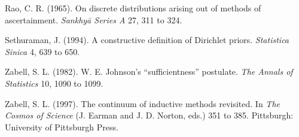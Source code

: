 \begin{thebibliography}{}
Rao, C. R. (1965). On discrete distributions arising out of methods of ascertainment.
\textit{Sankhy\=a Series A} 27, 311 to 324.

Sethuraman, J. (1994). A constructive definition of Dirichlet priors.
\textit{Statistica Sinica} 4, 639 to 650.

Zabell, S. L. (1982). W. E. Johnson's ``sufficientness'' postulate. \textit{The Annals
of Statistics} 10, 1090 to 1099.

Zabell, S. L. (1997). The continuum of inductive methods revisited. In \textit{The
Cosmos of Science} (J. Earman and J. D. Norton, eds.) 351 to 385. Pittsburgh:
University of Pittsburgh Press.

\end{thebibliography}
